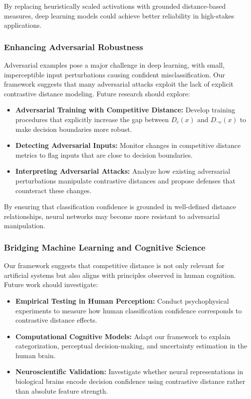 \documentclass[12pt]{article}
\begin{document}
By replacing heuristically scaled activations with grounded distance-based measures, deep learning models could achieve better reliability in high-stakes applications.

\subsubsection{Enhancing Adversarial Robustness}

Adversarial examples pose a major challenge in deep learning, with small, imperceptible input perturbations causing confident misclassification. Our framework suggests that many adversarial attacks exploit the lack of explicit contrastive distance modeling. Future research should explore:

\begin{itemize}
    \item \textbf{Adversarial Training with Competitive Distance:} Develop training procedures that explicitly increase the gap between \( D_c(x) \) and \( D_{\neg c}(x) \) to make decision boundaries more robust.
    \item \textbf{Detecting Adversarial Inputs:} Monitor changes in competitive distance metrics to flag inputs that are close to decision boundaries.
    \item \textbf{Interpreting Adversarial Attacks:} Analyze how existing adversarial perturbations manipulate contrastive distances and propose defenses that counteract these changes.
\end{itemize}

By ensuring that classification confidence is grounded in well-defined distance relationships, neural networks may become more resistant to adversarial manipulation.

\subsubsection{Bridging Machine Learning and Cognitive Science}

Our framework suggests that competitive distance is not only relevant for artificial systems but also aligns with principles observed in human cognition. Future work should investigate:

\begin{itemize}
    \item \textbf{Empirical Testing in Human Perception:} Conduct psychophysical experiments to measure how human classification confidence corresponds to contrastive distance effects.
    \item \textbf{Computational Cognitive Models:} Adapt our framework to explain categorization, perceptual decision-making, and uncertainty estimation in the human brain.
    \item \textbf{Neuroscientific Validation:} Investigate whether neural representations in biological brains encode decision confidence using contrastive distance rather than absolute feature strength.
\end{itemize}
\end{document}
